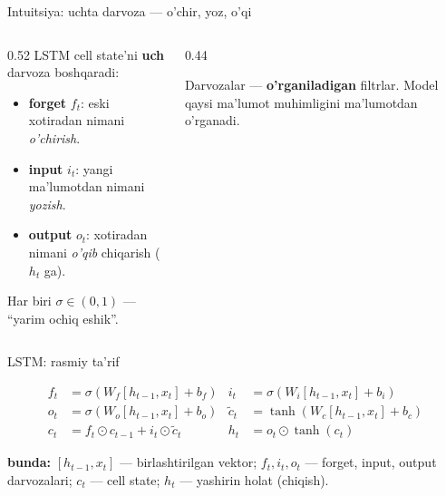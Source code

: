 \documentclass[aspectratio=169,11pt]{beamer}
\newcommand{\bunda}[1]{{\small\textbf{bunda:}\; #1}}
\begin{document}
\begin{frame}{Intuitsiya: uchta darvoza --- o'chir, yoz, o'qi}
  \begin{columns}[T]
    \begin{column}{0.52\textwidth}
      \small
      LSTM cell state'ni \textbf{uch} darvoza boshqaradi:
      \begin{itemize}\setlength\itemsep{1pt}
        \item \textbf{forget} $f_t$: eski xotiradan nimani \emph{o'chirish}.
        \item \textbf{input} $i_t$: yangi ma'lumotdan nimani \emph{yozish}.
        \item \textbf{output} $o_t$: xotiradan nimani \emph{o'qib} chiqarish ($h_t$ ga).
      \end{itemize}
      \vspace{4pt}
      Har biri $\sigma\in(0,1)$ --- ``yarim ochiq eshik''.
    \end{column}
    \begin{column}{0.44\textwidth}
      \begin{tcolorbox}[okbox,top=2pt,bottom=2pt]
        \footnotesize
        Darvozalar --- \textbf{o'rganiladigan} filtrlar. Model qaysi ma'lumot
        muhimligini ma'lumotdan o'rganadi.
      \end{tcolorbox}
    \end{column}
  \end{columns}
\end{frame}

\begin{frame}{LSTM: rasmiy ta'rif}
  \begin{tcolorbox}[defbox,title=Ta'rif: LSTM katagi]
    \vspace{-0.5em}
    \begin{align*}
      f_t &= \sigma(W_f[h_{t-1},x_t]+b_f) &
      i_t &= \sigma(W_i[h_{t-1},x_t]+b_i)\\
      o_t &= \sigma(W_o[h_{t-1},x_t]+b_o) &
      \tilde{c}_t &= \tanh(W_c[h_{t-1},x_t]+b_c)\\
      c_t &= f_t\odot c_{t-1}+i_t\odot\tilde{c}_t &
      h_t &= o_t\odot\tanh(c_t)
    \end{align*}
  \end{tcolorbox}
  \vspace{1pt}
  \bunda{$[h_{t-1},x_t]$ --- birlashtirilgan vektor; $f_t,i_t,o_t$ --- forget,
  input, output darvozalari; $c_t$ --- cell state; $h_t$ --- yashirin holat
  (chiqish).}
\end{frame}
\end{document}
